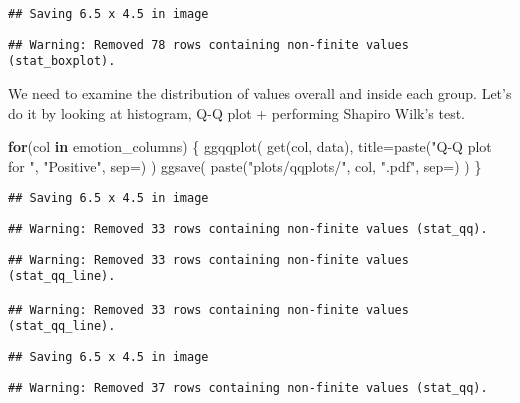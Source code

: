 \documentclass[
]{article}
\newenvironment{Shaded}{\begin{snugshade}}{\end{snugshade}}
\newcommand{\AttributeTok}[1]{\textcolor[rgb]{0.77,0.63,0.00}{#1}}
\newcommand{\ControlFlowTok}[1]{\textcolor[rgb]{0.13,0.29,0.53}{\textbf{#1}}}
\newcommand{\FunctionTok}[1]{\textcolor[rgb]{0.00,0.00,0.00}{#1}}
\newcommand{\NormalTok}[1]{#1}
\newcommand{\StringTok}[1]{\textcolor[rgb]{0.31,0.60,0.02}{#1}}
\begin{document}
\begin{verbatim}
## Saving 6.5 x 4.5 in image
\end{verbatim}

\begin{verbatim}
## Warning: Removed 78 rows containing non-finite values (stat_boxplot).
\end{verbatim}

We need to examine the distribution of values overall and inside each
group. Let's do it by looking at histogram, Q-Q plot + performing
Shapiro Wilk's test.

\begin{Shaded}
\begin{Highlighting}[]
\ControlFlowTok{for}\NormalTok{(col }\ControlFlowTok{in}\NormalTok{ emotion\_columns) \{}
  \FunctionTok{ggqqplot}\NormalTok{(}
    \FunctionTok{get}\NormalTok{(col, data),}
    \AttributeTok{title=}\FunctionTok{paste}\NormalTok{(}\StringTok{"Q{-}Q plot for "}\NormalTok{, }\StringTok{"Positive"}\NormalTok{, }\AttributeTok{sep=}\StringTok{\textquotesingle{}\textquotesingle{}}\NormalTok{)}
\NormalTok{  )}
  \FunctionTok{ggsave}\NormalTok{(}
    \FunctionTok{paste}\NormalTok{(}\StringTok{"plots/qqplots/"}\NormalTok{, col, }\StringTok{".pdf"}\NormalTok{, }\AttributeTok{sep=}\StringTok{\textquotesingle{}\textquotesingle{}}\NormalTok{)}
\NormalTok{  )}
\NormalTok{\}}
\end{Highlighting}
\end{Shaded}

\begin{verbatim}
## Saving 6.5 x 4.5 in image
\end{verbatim}

\begin{verbatim}
## Warning: Removed 33 rows containing non-finite values (stat_qq).
\end{verbatim}

\begin{verbatim}
## Warning: Removed 33 rows containing non-finite values (stat_qq_line).

## Warning: Removed 33 rows containing non-finite values (stat_qq_line).
\end{verbatim}

\begin{verbatim}
## Saving 6.5 x 4.5 in image
\end{verbatim}

\begin{verbatim}
## Warning: Removed 37 rows containing non-finite values (stat_qq).
\end{verbatim}
\end{document}
